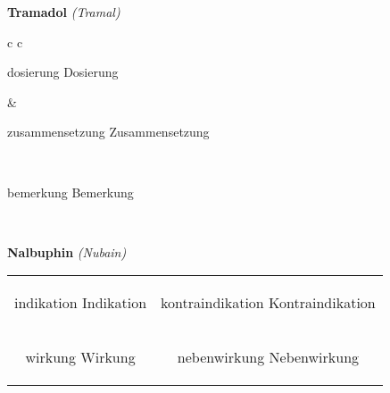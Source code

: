 \documentclass[12pt]{beamer}
\begin{document}
\begin{frame}{
    \textbf{Tramadol}
    \textit{(Tramal)}
}
    \begin{tabular}{c c}
        \begin{beamercolorbox}[wd=\boxwidth\textwidth,ht=\boxheight\textheight,sep=1em]{dosierung}
        Dosierung
        \end{beamercolorbox} & 
        \begin{beamercolorbox}[wd=\boxwidth\textwidth,ht=\boxheight\textheight,sep=1em]{zusammensetzung}
        Zusammensetzung
        \end{beamercolorbox} \\
        \begin{beamercolorbox}[wd=\textwidth,ht=\boxheight\textheight,sep=1em]{bemerkung}
        Bemerkung
        \end{beamercolorbox} \\
    \end{tabular}
\end{frame}

\begin{frame}{
    \textbf{Nalbuphin}
    \textit{(Nubain)}
}
    \begin{tabular}{c c}
        \begin{beamercolorbox}[wd=\boxwidth\textwidth,ht=\boxheight\textheight,sep=1em]{indikation}
        Indikation
        \end{beamercolorbox} & 
        \begin{beamercolorbox}[wd=\boxwidth\textwidth,ht=\boxheight\textheight,sep=1em]{kontraindikation}
        Kontraindikation 
        \end{beamercolorbox} \\
        \begin{beamercolorbox}[wd=\boxwidth\textwidth,ht=\boxheight\textheight,sep=1em]{wirkung}
        Wirkung
        \end{beamercolorbox} & 
        \begin{beamercolorbox}[wd=\boxwidth\textwidth,ht=\boxheight\textheight,sep=1em]{nebenwirkung}
        Nebenwirkung
        \end{beamercolorbox} \\
    \end{tabular}
\end{frame}
\end{document}
